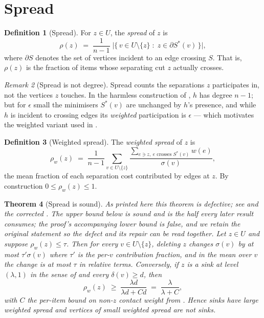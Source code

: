 \documentclass[11pt,a4paper]{article}
\newtheorem{theorem}{Theorem}[section]
\theoremstyle{definition}
\newtheorem{definition}[theorem]{Definition}
\theoremstyle{remark}
\newtheorem{remark}[theorem]{Remark}
\newcommand{\wt}{w}
\newcommand{\sep}{\sigma}
\newcommand{\dep}{\delta}
\newcommand{\spr}{\rho}                       %
\begin{document}
\section{Spread}
\label{sec:spread}

\begin{definition}[Spread]\label{def:spread}
For $z \in U$, the \emph{spread} of $z$ is
\[
\spr(z) \;=\; \frac{1}{n-1}\;
\bigl|\{\, v \in U \setminus \{z\} \;:\;
z \in \partial S^{\ast}(v) \,\}\bigr| ,
\]
where $\partial S$ denotes the set of vertices incident to an edge
crossing $S$. That is, $\spr(z)$ is the fraction of items whose
separating cut $z$ actually crosses.
\end{definition}

\begin{remark}[Spread is not degree]\label{rem:spread-vs-degree}
Spread counts the separations $z$ participates in, not the vertices $z$
touches. In the harmless construction of , $h$ has
degree $n-1$; but for $\epsilon$ small the minimisers $S^{\ast}(v)$ are
unchanged by $h$'s presence, and while $h$ is incident to crossing edges
its \emph{weighted} participation is $\epsilon$ --- which motivates the
weighted variant used in .
\end{remark}

\begin{definition}[Weighted spread]\label{def:wspread}
The \emph{weighted spread} of $z$ is
\[
\spr_{\wt}(z) \;=\; \frac{1}{n-1}
\sum_{v \in U \setminus \{z\}}
\frac{\sum_{e \ni z,\ e \text{ crosses } S^{\ast}(v)} \wt(e)}{\sep(v)} ,
\]
the mean fraction of each separation cost contributed by edges at $z$.
By construction $0 \leq \spr_{\wt}(z) \leq 1$.
\end{definition}

\begin{theorem}[Spread is sound]\label{thm:spread-sound}
\emph{As printed here this theorem is defective; see
 and the corrected
. The upper bound below is sound and is
the half every later result consumes; the proof's accompanying lower
bound is false, and we retain the original statement so the defect and
its repair can be read together.}
Let $z \in U$ and suppose $\spr_{\wt}(z) \leq \tau$. Then for every
$v \in U \setminus \{z\}$, deleting $z$ changes $\sep(v)$ by at most
$\tau' \sep(v)$ where $\tau'$ is the per-$v$ contribution fraction, and
in the mean over $v$ the change is at most $\tau$ in relative terms.
Conversely, if $z$ is a sink at level $(\lambda,1)$ in the sense of
 and every $\dep(v) \geq d$, then
\[
\spr_{\wt}(z) \;\geq\; \frac{\lambda d}{\lambda d + C d}
\;=\; \frac{\lambda}{\lambda + C},
\]
with $C$ the per-item bound on non-$z$ contact weight from
. Hence sinks have large weighted spread and vertices
of small weighted spread are not sinks.
\end{theorem}
\end{document}
